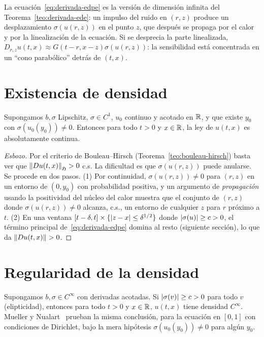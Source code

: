 \begin{intuicion}
La ecuación~\eqref{eq:derivada-edpe} es la versión de dimensión infinita del Teorema~\ref{teo:derivada-ede}: un impulso del
ruido en $(r,z)$ produce un desplazamiento $\sigma(u(r,z))$ en el punto $z$, que después se propaga
por el calor y por la linealización de la ecuación. Si se desprecia la parte linealizada,
$D_{r,z}u(t,x)\approx G(t-r,x-z)\sigma(u(r,z))$: la sensibilidad está concentrada en un ``cono
parabólico'' detrás de $(t,x)$.
\end{intuicion}

\section{Existencia de densidad}

\begin{teorema}
Supongamos $b,\sigma$ Lipschitz, $\sigma\in C^1$, $u_0$ continuo y
acotado en $\mathbb{R}$, y que existe $y_0$ con $\sigma(u_0(y_0))\ne0$. Entonces para todo $t>0$ y $x\in\mathbb{R}$, la ley de
$u(t,x)$ es absolutamente continua.
\end{teorema}

\begin{proof}[Esbozo]
Por el criterio de Bouleau--Hirsch (Teorema~\ref{teo:bouleau-hirsch}) basta ver que $\left\lVert Du(t,x)\right\rVert_{\mathfrak{H}}>0$ c.s.
La dificultad es que $\sigma(u(r,z))$ puede anularse. Se procede en dos pasos. (1) Por continuidad,
$\sigma(u(r,z))\ne0$ para $(r,z)$ en un entorno de $(0,y_0)$ con probabilidad positiva, y un argumento de
\emph{propagación} usando la positividad del núcleo del calor muestra que el conjunto de $(r,z)$ donde
$\sigma(u(r,z))\ne0$ alcanza, c.s., un entorno de cualquier $z$ para $r$ próximo a $t$. (2) En una ventana
$[t-\delta,t]\times\{\left\lvert z-x\right\rvert\le\delta^{1/2}\}$ donde $\left\lvert \sigma(u)\right\rvert\ge c>0$, el término principal de~\eqref{eq:derivada-edpe} domina al resto
(siguiente sección), lo que da $\left\lVert Du(t,x)\right\rVert>0$.
\end{proof}

\section{Regularidad de la densidad}

\begin{teorema}\label{teo:regularidad-edpe}
Supongamos $b,\sigma\in C^\infty$ con
derivadas acotadas. Si $\left\lvert \sigma(v)\right\rvert\ge c>0$ para todo $v$ \textup{(elipticidad)}, entonces para todo $t>0$
y $x\in\mathbb{R}$, $u(t,x)$ tiene densidad $C^\infty$. Mueller y Nualart~\cite{MuellerNualart08} prueban la misma conclusión,
para la ecuación en $[0,1]$ con condiciones de Dirichlet, bajo la mera hipótesis $\sigma(u_0(y_0))\ne0$
para algún $y_0$.
\end{teorema}

